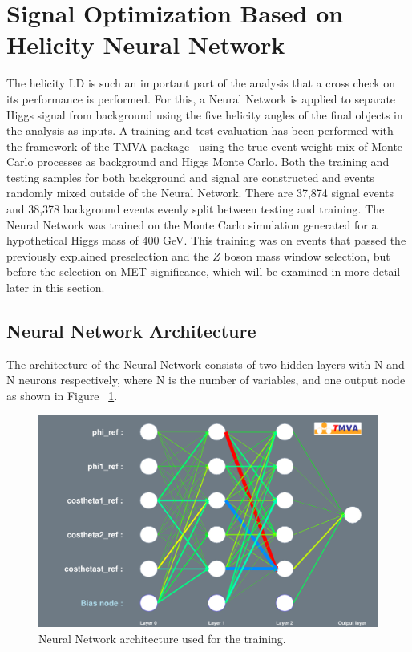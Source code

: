 
\section{Signal Optimization Based on Helicity Neural Network}
The helicity LD is such an important part of the analysis that a cross check on its performance is performed.  For this, a Neural Network is applied to separate Higgs signal from background using the five helicity angles of the final objects in the analysis as inputs. A training and test evaluation has been performed with the framework of the TMVA package~\cite{tmva} using the true event weight mix of Monte Carlo processes as background and Higgs Monte Carlo. Both the training and testing samples for both background and signal are constructed and events randomly mixed outside of the Neural Network.  There are 37,874 signal events and 38,378 background events evenly split between testing and training.  The Neural Network was trained on the Monte Carlo simulation generated for a hypothetical Higgs mass of 400 GeV. This training was on events that passed the previously explained preselection and the $Z$ boson mass window selection, but before the selection on MET significance, which will be examined in more detail later in this section.


\subsection{Neural Network Architecture}
The architecture of the Neural Network consists of two hidden layers with N and N neurons respectively, where N is the number of variables, and one output node as shown in Figure ~\ref{fig:NNarch}.



\begin{figure}[htb!]
\begin{center}
\centerline{
\includegraphics[width=0.6\linewidth]{Optimization/plots/NN/nn_network_architecture.pdf}
}
\caption{
Neural Network architecture used for the training.
}
\label{fig:NNarch}
\end{center}
\end{figure}


